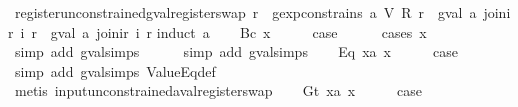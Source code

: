 \begin{isabellebody}
\isamarkupfalse%
%
\endisatagproof
{\isafoldproof}%
%
\isadelimproof
\isanewline
%
\endisadelimproof
\isanewline
{}\isamarkupfalse%
\ register{\isacharunderscore}unconstrained{\isacharunderscore}gval{\isacharunderscore}register{\isacharunderscore}swap{\isacharcolon}\ {\isachardoublequoteopen}{\isasymforall}r{\isachardot}\ {\isasymnot}\ gexp{\isacharunderscore}constrains\ a\ {\isacharparenleft}V\ {\isacharparenleft}R\ r{\isacharparenright}{\isacharparenright}\ {\isasymLongrightarrow}\ {\isacharparenleft}gval\ a\ {\isacharparenleft}join{\isacharunderscore}ir\ i\ r{\isacharparenright}\ {\isacharequal}\ gval\ a\ {\isacharparenleft}join{\isacharunderscore}ir\ i\ r{\isacharprime}{\isacharparenright}{\isacharparenright}{\isachardoublequoteclose}\isanewline
%
\isadelimproof
%
\endisadelimproof
%
\isatagproof
{}\isamarkupfalse%
{\isacharparenleft}induct\ a{\isacharparenright}\isanewline
\ \ \isamarkupfalse%
\ {\isacharparenleft}Bc\ x{\isacharparenright}\isanewline
\ \ \isamarkupfalse%
\ \isamarkupfalse%
\ {\isacharquery}case\isanewline
\ \ \ \ \isamarkupfalse%
\ {\isacharparenleft}cases\ x{\isacharparenright}\isanewline
\ \ \ \ \ \isamarkupfalse%
\ {\isacharparenleft}simp\ add{\isacharcolon}\ gval{\isachardot}simps{\isacharparenleft}{}{\isacharparenright}{\isacharparenright}\isanewline
\ \ \ \ \isamarkupfalse%
\ {\isacharparenleft}simp\ add{\isacharcolon}\ gval{\isachardot}simps{\isacharparenleft}{}{\isacharparenright}{\isacharparenright}\isanewline
{}\isamarkupfalse%
\isanewline
\ \ \isamarkupfalse%
\ {\isacharparenleft}Eq\ x{}a\ x{}{\isacharparenright}\isanewline
\ \ \isamarkupfalse%
\ \isamarkupfalse%
\ {\isacharquery}case\isanewline
\ \ \ \ \isamarkupfalse%
\ {\isacharparenleft}simp\ add{\isacharcolon}\ gval{\isachardot}simps\ ValueEq{\isacharunderscore}def{\isacharparenright}\isanewline
\ \ \ \ \isamarkupfalse%
\ {\isacharparenleft}metis\ input{\isacharunderscore}unconstrained{\isacharunderscore}aval{\isacharunderscore}register{\isacharunderscore}swap{\isacharparenright}\isanewline
{}\isamarkupfalse%
\isanewline
\ \ \isamarkupfalse%
\ {\isacharparenleft}Gt\ x{}a\ x{}{\isacharparenright}\isanewline
\ \ \isamarkupfalse%
\ \isamarkupfalse%
\ {\isacharquery}case\isanewline
\ \ \ \ \isamarkupfalse%

\end{isabellebody}
